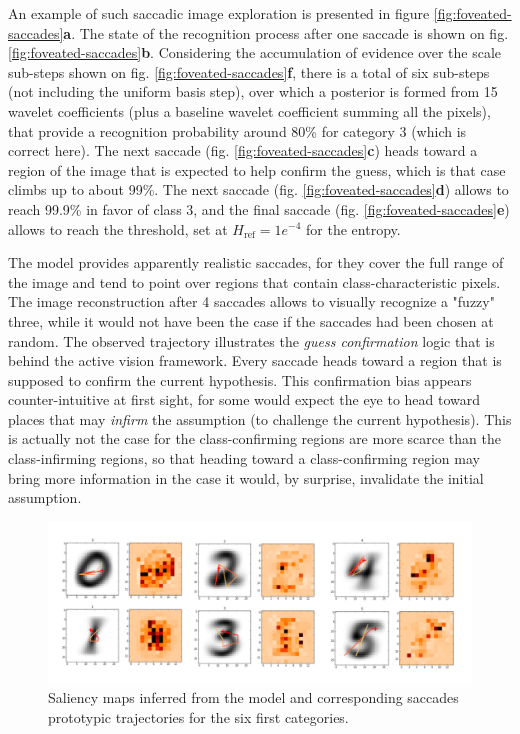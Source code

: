 \documentclass{article} %
\begin{document}
An example of such saccadic image exploration is presented in figure \ref{fig:foveated-saccades}\textbf{a}.
The state of the recognition process after one saccade is shown on fig. \ref{fig:foveated-saccades}\textbf{b}. Considering the accumulation of evidence over the scale sub-steps shown on fig. \ref{fig:foveated-saccades}\textbf{f}, there is a total of six sub-steps (not including the uniform basis step), over which a posterior is formed from 15 wavelet coefficients (plus a baseline wavelet coefficient summing all the pixels), that provide a recognition probability around 80\% for category 3 (which is correct here). The next saccade (fig. \ref{fig:foveated-saccades}\textbf{c})  heads toward a region of the image that is expected to help confirm the guess, which is that case climbs up to about 99\%. The next saccade (fig. \ref{fig:foveated-saccades}\textbf{d})  allows to reach 99.9\% in favor of class 3, and the final saccade (fig. \ref{fig:foveated-saccades}\textbf{e}) allows to reach the threshold, set at $H_\text{ref} = 1e^{-4}$ for the entropy.   

The model provides apparently realistic saccades, for they cover the full range of the image and tend to point over regions that contain class-characteristic pixels. The image reconstruction after 4 saccades allows to visually recognize a "fuzzy" three, while it would not have been the case if the saccades had been chosen at random.
The observed trajectory illustrates the \emph{guess confirmation} logic that is behind the active vision framework. Every saccade heads toward a region that is supposed to confirm the current hypothesis. This confirmation bias appears counter-intuitive at first sight, for some would expect the eye to head toward places that may \emph{infirm} the assumption (to challenge the current hypothesis). This is actually not the case for the class-confirming regions are more scarce than the class-infirming regions, so that heading toward a class-confirming region may bring more information in the case it would, by surprise, invalidate the initial assumption.



\begin{figure}[t!]
	\centerline{
		\includegraphics[width = \linewidth]{img/ICLR-saliency-maps.png} 
	}
	\caption{Saliency maps inferred from the model and corresponding saccades prototypic trajectories for the six first categories.}\label{fig:saliency-maps}
\end{figure}
\end{document}

